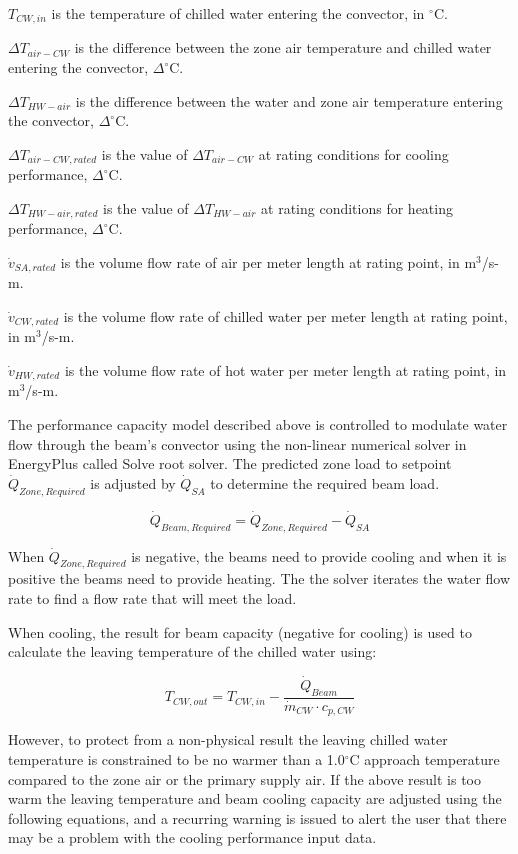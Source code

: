 \({T_{CW,in}}\) is the temperature of chilled water entering the convector, in \(^{\circ}\)C.

\({\Delta T_{air-CW}}\) is the difference between the zone air temperature and chilled water entering the convector, \(\Delta^{\circ}\)C.

\({\Delta T_{HW-air}}\) is the difference between the water and zone air temperature entering the convector, \(\Delta^{\circ}\)C.

\({\Delta T_{air-CW,rated}}\) is the value of \({\Delta T_{air-CW}}\) at rating conditions for cooling performance, \(\Delta^{\circ}\)C.

\({\Delta T_{HW-air,rated}}\) is the value of \({\Delta T_{HW-air}}\) at rating conditions for heating performance, \(\Delta^{\circ}\)C.

\({\dot v_{SA,rated}}\) is the volume flow rate of air per meter length at rating point, in m\(^{3}\)/s-m.

\({\dot v_{CW,rated}}\) is the volume flow rate of chilled water per meter length at rating point, in m\(^{3}\)/s-m.

\({\dot v_{HW,rated}}\) is the volume flow rate of hot water per meter length at rating point, in m\(^{3}\)/s-m.

The performance capacity model described above is controlled to modulate water flow through the beam's convector using the non-linear numerical solver in EnergyPlus called Solve root solver. The predicted zone load to setpoint \({\dot Q_{Zone, Required}}\) is adjusted by \({\dot Q_{SA}}\) to determine the required beam load.

\begin{equation}
{\dot Q_{Beam, Required}} = {\dot Q_{Zone, Required}} - {\dot Q_{SA}}
\end{equation}

When \({\dot Q_{Zone, Required}}\) is negative, the beams need to provide cooling and when it is positive the beams need to provide heating. The the solver iterates the water flow rate to find a flow rate that will meet the load.

When cooling, the result for beam capacity (negative for cooling) is used to calculate the leaving temperature of the chilled water using:

\begin{equation}
{T_{CW,out}} = {T_{CW,in}} - \frac{{\dot Q_{Beam}}}{{\dot m_{CW}} \cdot {c_{p,CW}} }
\end{equation}

However, to protect from a non-physical result the leaving chilled water temperature is constrained to be no warmer than a 1.0\(^{\circ}\)C approach temperature compared to the zone air or the primary supply air. If the above result is too warm the leaving temperature and beam cooling capacity are adjusted using the following equations, and a recurring warning is issued to alert the user that there may be a problem with the cooling performance input data.

